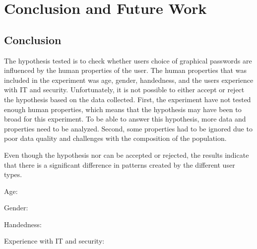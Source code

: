 \chapter{Conclusion and Future Work}\label{chap:conclusion}
  

  \clearpage
  \section{Conclusion}
    
    The hypothesis tested is to check whether users choice of graphical passwords are influenced by the human properties of the user. The human properties that was included in the experiment was age, gender, handedness, and the users experience with IT and security. 
    Unfortunately, it is not possible to either accept or reject the hypothesis based on the data collected. First, the experiment have not tested enough human properties, which means that the hypothesis may have been to broad for this experiment. To be able to answer this hypothesis, more data and properties need to be analyzed. Second, some properties had to be ignored due to poor data quality and challenges with the composition of the population.

    Even though the hypothesis nor can be accepted or rejected, the results indicate that there is a significant difference in patterns created by the different user types. 


    Age: 

    Gender:

    Handedness:

    Experience with IT and security:



